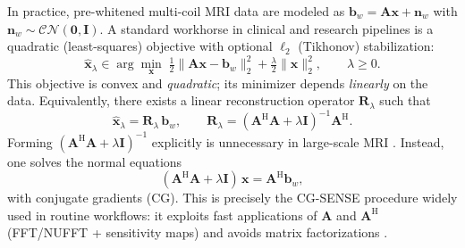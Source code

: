 \documentclass[AMA,STIX2COL,Linenumberson]{MRM}
\begin{document}
In practice, pre-whitened multi-coil MRI data are modeled as \(\mathbf{b}_w=\mathbf{A}\mathbf{x}+\mathbf{n}_w\) with \(\mathbf{n}_w\sim\mathcal{CN}(\mathbf{0},\mathbf{I})\). A standard workhorse in clinical and research pipelines is a quadratic (least-squares) objective with optional \(\ell_2\) (Tikhonov) stabilization:
\begin{equation}
\hat{\mathbf{x}}_\lambda \in \arg\min_{\mathbf{x}}\; \tfrac{1}{2}\|\mathbf{A}\mathbf{x}-\mathbf{b}_w\|_2^2 + \tfrac{\lambda}{2}\|\mathbf{x}\|_2^2, \qquad \lambda \ge 0.
\label{eq:tik_objective}
\end{equation}
This objective is convex and \emph{quadratic}; its minimizer depends \emph{linearly} on the data. Equivalently, there exists a linear reconstruction operator \(\mathbf{R}_\lambda\) such that
\begin{equation}
\hat{\mathbf{x}}_\lambda = \mathbf{R}_\lambda\,\mathbf{b}_w,
\qquad
\mathbf{R}_\lambda = (\mathbf{A}^{\mathrm{H}}\mathbf{A}+\lambda\mathbf{I})^{-1}\mathbf{A}^{\mathrm{H}}.
\label{eq:R_lambda}
\end{equation}
Forming \((\mathbf{A}^{\mathrm{H}}\mathbf{A}+\lambda\mathbf{I})^{-1}\) explicitly is unnecessary in large-scale MRI \cite{yeung2025algebraic}. Instead, one solves the normal equations
\begin{equation}
(\mathbf{A}^{\mathrm{H}}\mathbf{A}+\lambda\mathbf{I})\,\mathbf{x}=\mathbf{A}^{\mathrm{H}}\mathbf{b}_w,
\label{eq:normal_equations}
\end{equation}
with conjugate gradients (CG). This is precisely the CG-SENSE procedure widely used in routine workflows: it exploits fast applications of \(\mathbf{A}\) and \(\mathbf{A}^{\mathrm{H}}\) (FFT/NUFFT + sensitivity maps) and avoids matrix factorizations \cite{cg_sense_revisited,Pruessmann2001}. 

\end{document}
